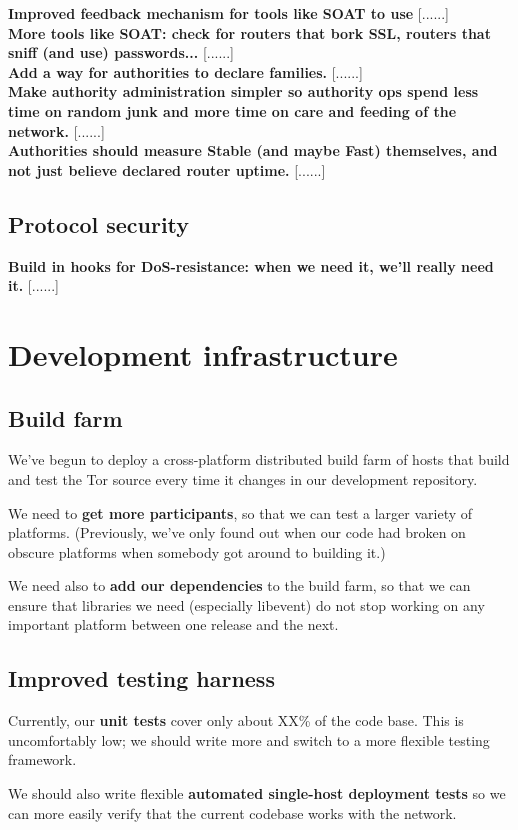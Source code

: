 \documentclass{article}
\newcommand{\tmp}[1]{{\bf #1} [......] \\}
\begin{document}
\tmp{Improved feedback mechanism for tools like SOAT to use}

\tmp{More tools like SOAT: check for routers that bork SSL, routers that
  sniff (and use) passwords...}

\tmp{Add a way for authorities to declare families.}

\tmp{Make authority administration simpler so authority ops spend less time
  on random junk and more time on care and feeding of the network.}

\tmp{Authorities should measure Stable (and maybe Fast) themselves, and not
  just believe declared router uptime.}

\subsection{Protocol security}

\tmp{Build in hooks for DoS-resistance: when we need it, we'll really need
  it.}


\section{Development infrastructure}

\subsection{Build farm}
We've begun to deploy a cross-platform distributed build farm of hosts
that build and test the Tor source every time it changes in our development
repository.

We need to {\bf get more participants}, so that we can test a larger variety
of platforms.  (Previously, we've only found out when our code had broken on
obscure platforms when somebody got around to building it.)

We need also to {\bf add our dependencies} to the build farm, so that we can
ensure that libraries we need (especially libevent) do not stop working on
any important platform between one release and the next.

\subsection{Improved testing harness}
Currently, our {\bf unit tests} cover only about XX\% of the code base.  This
is uncomfortably low; we should write more and switch to a more flexible
testing framework.

We should also write flexible {\bf automated single-host deployment tests} so
we can more easily verify that the current codebase works with the network.
\end{document}
